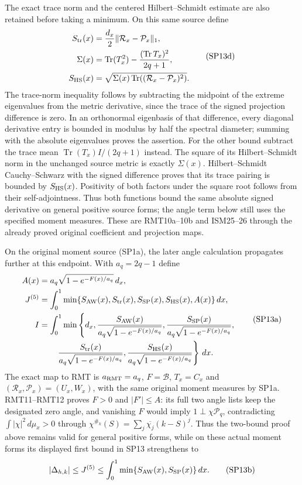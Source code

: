 The exact trace norm and the centered Hilbert--Schmidt estimate
are also retained before taking a minimum. On this same source define
\[
 \begin{aligned}
 S_{\rm tr}(x)&=\frac{d_x}{2}\|\mathcal R_x-\mathcal P_x\|_1,\\
 \Sigma(x)&=\operatorname{Tr}(T_x^2)
       -\frac{(\operatorname{Tr}T_x)^2}{2q+1},\\
 S_{\rm HS}(x)&=\sqrt{\Sigma(x)\operatorname{Tr}((\mathcal R_x-\mathcal P_x)^2)}.
 \end{aligned}
 \tag{SP13d}
\]
The trace-norm inequality follows by subtracting the midpoint
of the extreme eigenvalues from the metric derivative, since the
trace of the signed projection difference is zero. In an orthonormal
eigenbasis of that difference, every diagonal derivative entry is
bounded in modulus by half the spectral diameter; summing with
the absolute eigenvalues proves the assertion.
For the other bound subtract the trace mean
$\operatorname{Tr}(T_x)I/(2q+1)$ instead.
The square of its Hilbert--Schmidt norm in the unchanged source
metric is exactly $\Sigma(x)$. Hilbert--Schmidt Cauchy--Schwarz
with the signed difference proves that its trace pairing is bounded
by $S_{\rm HS}(x)$. Positivity of both factors under the square
root follows from their self-adjointness. Thus both functions bound
the same absolute signed derivative on general positive source forms;
the angle term below still uses the specified moment measures.
These are RMT10a--10b and ISM25--26 through the already proved
original coefficient and projection maps.

On the original moment source (SP1a), the later angle calculation
propagates further at this endpoint. With $a_q=2q-1$ define
\[
 \begin{aligned}
 A(x)&=a_q\sqrt{1-e^{-F(x)/a_q}}\,d_x,\\
 J^{(5)}&=\int_0^1\min\{S_{\rm AW}(x),S_{\rm tr}(x),S_{\rm SP}(x),S_{\rm HS}(x),A(x)\}\,dx,\\
 I&=\int_0^1\min\left\{d_x,
 \frac{S_{\rm AW}(x)}{a_q\sqrt{1-e^{-F(x)/a_q}}},
 \frac{S_{\rm SP}(x)}{a_q\sqrt{1-e^{-F(x)/a_q}}},\right.
 \\
 &\hspace{2em}\left. \frac{S_{\rm tr}(x)}{a_q\sqrt{1-e^{-F(x)/a_q}}},
 \frac{S_{\rm HS}(x)}{a_q\sqrt{1-e^{-F(x)/a_q}}}\right\}\,dx .
 \end{aligned}
 \tag{SP13a}
\]
The exact map to RMT is $a_{\rm RMT}=a_q$, $F=\mathcal B$, $T_x=C_x$ and
$(\mathcal R_x,\mathcal P_x)=(U_x,W_x)$, with the same original
moment measures by SP1a. RMT11--RMT12 proves $F>0$ and
$|F'|\le A$: its full two angle lists keep the designated zero
angle, and vanishing $F$ would imply $1\perp\chi\mathcal P_q$,
contradicting $\int|\chi|^2\,d\mu_x>0$ through
$\chi^{\#_k}(S)=\sum_j\overline{\chi_j}(k-S)^j$.
Thus the two-bound proof above remains valid for general positive
forms, while on these actual moment forms its displayed first
bound in SP13 strengthens to
\[
 |\Delta_{h,k}|\le J^{(5)}
 \le\int_0^1\min\{S_{\rm AW}(x),S_{\rm SP}(x)\}\,dx .
 \tag{SP13b}
\]

